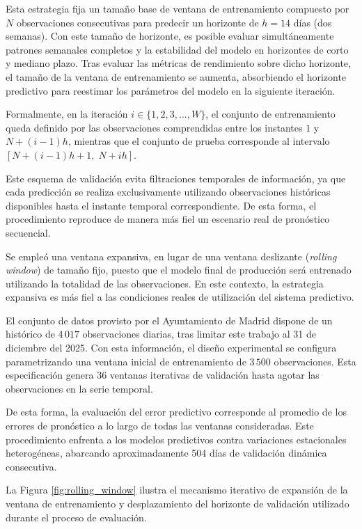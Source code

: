 Esta estrategia fija un tamaño base de ventana de entrenamiento compuesto por $N$ observaciones consecutivas para predecir un horizonte de $h = 14$ días (dos semanas). Con este tamaño de horizonte, es posible evaluar simultáneamente patrones semanales completos y la estabilidad del modelo en horizontes de corto y mediano plazo. Tras evaluar las métricas de rendimiento sobre dicho horizonte, el tamaño de la ventana de entrenamiento se aumenta, absorbiendo el horizonte predictivo para reestimar los parámetros del modelo en la siguiente iteración.

Formalmente, en la iteración $i \in \{1, 2, 3, ..., W\}$, el conjunto de entrenamiento queda definido por las observaciones comprendidas entre los instantes $1$ y $N+(i-1)h$, mientras que el conjunto de prueba corresponde al intervalo $[N+(i-1)h+1,\; N+ih]$.

Este esquema de validación evita filtraciones temporales de información, ya que cada predicción se realiza exclusivamente utilizando observaciones históricas disponibles hasta el instante temporal correspondiente. De esta forma, el procedimiento reproduce de manera más fiel un escenario real de pronóstico secuencial.

Se empleó una ventana expansiva, en lugar de una ventana deslizante (\textit{rolling window}) de tamaño fijo, puesto que el modelo final de producción será entrenado utilizando la totalidad de las observaciones. En este contexto, la estrategia expansiva es más fiel a las condiciones reales de utilización del sistema predictivo.

El conjunto de datos provisto por el Ayuntamiento de Madrid dispone de un histórico de $4\,017$ observaciones diarias, tras limitar este trabajo al 31 de diciembre del 2025. Con esta información, el diseño experimental se configura parametrizando una ventana inicial de entrenamiento de $3\,500$ observaciones. Esta especificación genera $36$ ventanas iterativas de validación hasta agotar las observaciones en la serie temporal.

De esta forma, la evaluación del error predictivo corresponde al promedio de los errores de pronóstico a lo largo de todas las ventanas consideradas. Este procedimiento enfrenta a los modelos predictivos contra variaciones estacionales heterogéneas, abarcando aproximadamente 504 días de validación dinámica consecutiva.

La Figura \ref{fig:rolling_window} ilustra el mecanismo iterativo de expansión de la ventana de entrenamiento y desplazamiento del horizonte de validación utilizado durante el proceso de evaluación.

